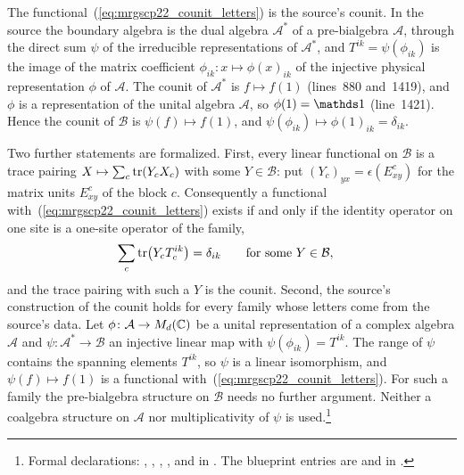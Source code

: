 \documentclass{article}
\begin{document}
The functional~(\ref{eq:mrgscp22_counit_letters}) is the source's counit.
In the source the boundary algebra is the dual algebra $\mathcal A^*$ of a
pre-bialgebra $\mathcal A$, through the direct sum $\psi$ of the irreducible
representations of $\mathcal A^*$, and $T^{ik}=\psi(\phi_{ik})$ is the image
of the matrix coefficient $\phi_{ik}\colon x\mapsto\phi(x)_{ik}$ of the
injective physical representation $\phi$ of $\mathcal A$.  The counit of
$\mathcal A^*$ is $f\mapsto f(1)$ (lines~880 and~1419), and $\phi$ is a
representation of the unital algebra $\mathcal A$, so $\phi(1)=\Id$
(line~1421).  Hence the counit of $\mathcal B$ is
$\psi(f)\mapsto f(1)$, and $\psi(\phi_{ik})\mapsto\phi(1)_{ik}=\delta_{ik}$.

Two further statements are formalized.  First, every linear functional on
$\mathcal B$ is a trace pairing $X\mapsto\sum_c\operatorname{tr}(Y_cX_c)$ with some
$Y\in\mathcal B$: put $(Y_c)_{yx}=\epsilon(E^c_{xy})$ for the matrix units
$E^c_{xy}$ of the block $c$.  Consequently a functional
with~(\ref{eq:mrgscp22_counit_letters}) exists if and only if the identity
operator on one site is a one-site operator of the family,
\begin{align}
    \sum_c\operatorname{tr}\bigl(Y_cT_c^{ik}\bigr)
     & =\delta_{ik}
    \qquad\text{for some }Y\in\mathcal B,
    \label{eq:mrgscp22_unit_condition}
\end{align}
and the trace pairing with such a $Y$ is the counit.  Second, the source's
construction of the counit holds for every family whose letters come from
the source's data.  Let $\phi\colon\mathcal A\to M_d(\mathbb{C})$ be a unital
representation of a complex algebra $\mathcal A$ and
$\psi\colon\mathcal A^*\to\mathcal B$ an injective linear map with
$\psi(\phi_{ik})=T^{ik}$.  The range of $\psi$ contains the spanning
elements $T^{ik}$, so $\psi$ is a linear isomorphism, and
$\psi(f)\mapsto f(1)$ is a functional
with~(\ref{eq:mrgscp22_counit_letters}).  For such a family the
pre-bialgebra structure on $\mathcal B$ needs no further argument.  Neither
a coalgebra structure on $\mathcal A$ nor multiplicativity of $\psi$ is
used.\footnote{Formal declarations:
    ,
    ,
    ,
    ,
    and
    in .  The blueprint
    entries are  and
     in
    .}
\end{document}
